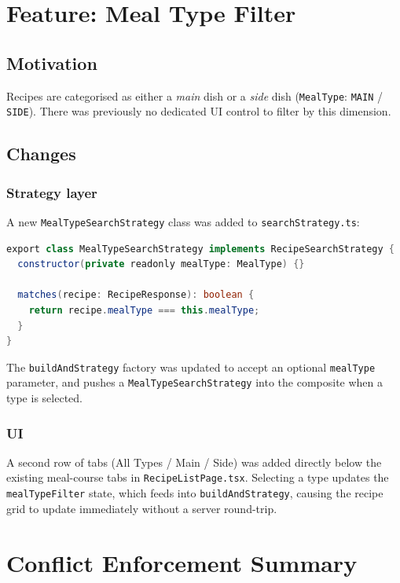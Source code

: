 \documentclass[12pt,a4paper]{article}
\begin{document}
\section{Feature: Meal Type Filter}

\subsection{Motivation}
Recipes are categorised as either a \emph{main} dish or a \emph{side} dish
(\texttt{MealType}: \texttt{MAIN} / \texttt{SIDE}).  There was previously no
dedicated UI control to filter by this dimension.

\subsection{Changes}

\subsubsection{Strategy layer}
A new \texttt{MealTypeSearchStrategy} class was added to
\texttt{searchStrategy.ts}:

\begin{lstlisting}[language=Java, caption={MealTypeSearchStrategy.ts}]
export class MealTypeSearchStrategy implements RecipeSearchStrategy {
  constructor(private readonly mealType: MealType) {}

  matches(recipe: RecipeResponse): boolean {
    return recipe.mealType === this.mealType;
  }
}
\end{lstlisting}

The \texttt{buildAndStrategy} factory was updated to accept an optional
\texttt{mealType} parameter, and pushes a \texttt{MealTypeSearchStrategy} into
the composite when a type is selected.

\subsubsection{UI}
A second row of tabs (All Types / Main / Side) was added directly below the
existing meal-course tabs in \texttt{RecipeListPage.tsx}.  Selecting a type
updates the \texttt{mealTypeFilter} state, which feeds into
\texttt{buildAndStrategy}, causing the recipe grid to update immediately
without a server round-trip.

\section{Conflict Enforcement Summary}
\end{document}
